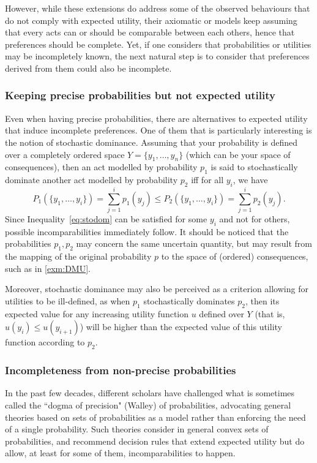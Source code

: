 \documentclass[french, english]{llncs}
\begin{document}
	However, while these extensions do address some of the observed behaviours that do not comply with expected utility, their axiomatic or models keep assuming that every acts can or should be comparable between each others, hence that preferences should be complete. Yet, if one considers that probabilities or utilities may be incompletely known, the next natural step is to consider that preferences derived from them could also be incomplete. 
	
	\subsubsection{Keeping precise probabilities but not expected utility}
	
	Even when having precise probabilities, there are alternatives to expected utility that induce incomplete preferences. One of them that is particularly interesting is the notion of stochastic dominance. Assuming that your probability is defined over a completely ordered space $Y=\{y_1,\ldots,y_n\}$ (which can be your space of consequences), then an act modelled by probability $p_1$ is said to stochastically dominate another act modelled by probability $p_2$ iff for all $y_i$, we have
	\begin{equation}\label{eq:stodom}P_1(\{y_1,\ldots,y_i\})=\sum_{j=1}^i p_1(y_j) \leq P_2(\{y_1,\ldots,y_i\})=\sum_{j=1}^i p_2(y_j).\end{equation}
	Since Inequality~\eqref{eq:stodom} can be satisfied for some $y_i$ and not for others, possible incomparabilities immediately follow. It should be noticed that the probabilities $p_1,p_2$ may concern the same uncertain quantity, but may result from the mapping of the original probability $p$ to the space of (ordered) consequences, such as in \cref{exm:DMU}.
	
	Moreover, stochastic dominance may also be perceived as a criterion allowing for utilities to be ill-defined, as when $p_1$ stochastically dominates $p_2$, then its expected value for any increasing utility function $u$ defined over $Y$ (that is, $u(y_i) \leq u(y_{i+1})$) will be higher than the expected value of this utility function according to $p_2$. 
		
	\subsubsection{Incompleteness from non-precise probabilities}
	
	In the past few decades, different scholars have challenged what is sometimes called the ``dogma of precision" (Walley) of probabilities, advocating general theories based on sets of probabilities as a model rather than enforcing the need of a single probability. Such theories consider in general convex sets of probabilities, and recommend decision rules that extend expected utility but do allow, at least for some of them, incomparabilities to happen. 
	
\end{document}
